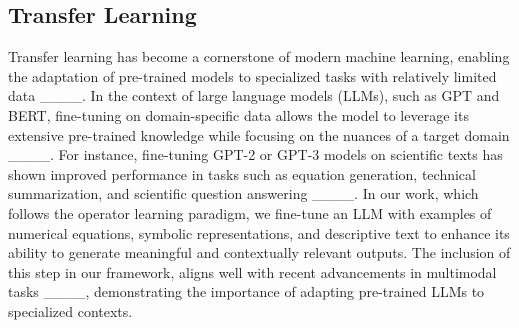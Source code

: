\subsection{Transfer Learning}
Transfer learning has become a cornerstone of modern machine learning, enabling the adaptation of pre-trained models to specialized tasks with relatively limited data ____. In the context of large language models (LLMs), such as GPT and BERT, fine-tuning on domain-specific data allows the model to leverage its extensive pre-trained knowledge while focusing on the nuances of a target domain ____. For instance, fine-tuning GPT-2 or GPT-3 models on scientific texts has shown improved performance in tasks such as equation generation, technical summarization, and scientific question answering ____. In our work, which follows the operator learning paradigm, we fine-tune an LLM with examples of numerical equations, symbolic representations, and descriptive text to enhance its ability to generate meaningful and contextually relevant outputs. The inclusion of this step in our framework, aligns well with recent advancements in multimodal tasks ____, demonstrating the importance of adapting pre-trained LLMs to specialized contexts.